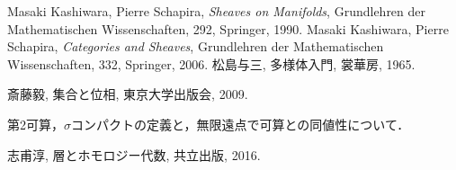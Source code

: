 \begin{thebibliography}{20} 
     Masaki Kashiwara, Pierre Schapira, 
        \textit{Sheaves on Manifolds}, 
        Grundlehren der Mathematischen Wissenschaften, 292, Springer, 1990.
     Masaki Kashiwara, Pierre Schapira, 
        \textit{Categories and Sheaves}, 
        Grundlehren der Mathematischen Wissenschaften, 332, Springer, 2006.
     松島与三, 多様体入門, 裳華房, 1965.

     斎藤毅, 集合と位相, 東京大学出版会, 2009.
        
        第2可算，\(\sigma\)コンパクトの定義と，無限遠点で可算との同値性について．

     志甫淳, 層とホモロジー代数, 共立出版, 2016.
\end{thebibliography}




